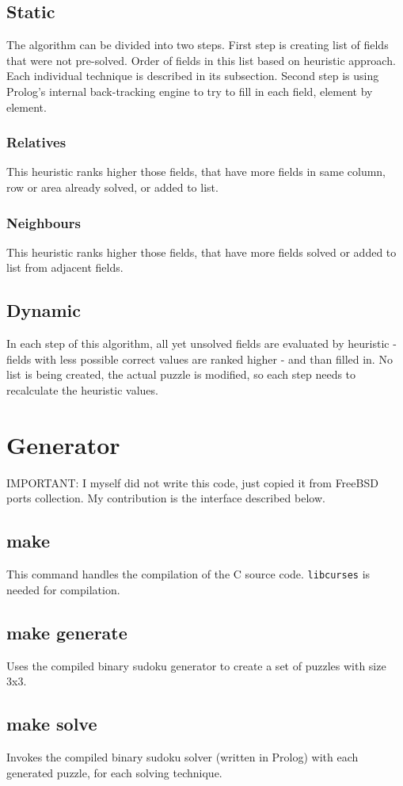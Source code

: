 \documentclass{article}
\begin{document}
	\subsection{Static}
	The algorithm can be divided into two steps. First step is creating list of fields that were not pre-solved. Order of fields in this list based on heuristic approach. Each individual technique is described in its subsection.
	\newline Second step is using Prolog's internal back-tracking engine to try to fill in each field, element by element.
	\subsubsection{Relatives}
	This heuristic ranks higher those fields, that have more fields in same column, row or area already solved, or added to list.
	\subsubsection{Neighbours}
	This heuristic ranks higher those fields, that have more fields solved or added to list from adjacent fields.
	\subsection{Dynamic}
	In each step of this algorithm, all yet unsolved fields are evaluated by heuristic - fields with less possible correct values are ranked higher - and than filled in. No list is being created, the actual puzzle is modified, so each step needs to recalculate the heuristic values.
	\section{Generator}
	IMPORTANT: I myself did not write this code, just copied it from FreeBSD ports collection. My contribution is the interface described below.
	\subsection{make}
	This command handles the compilation of the C source code. {\tt libcurses} is needed for compilation.
	\subsection{make generate}
	Uses the compiled binary sudoku generator to create a set of puzzles with size 3x3.
	\subsection{make solve}
	Invokes the compiled binary sudoku solver (written in Prolog) with each generated puzzle, for each solving technique.
\end{document}
